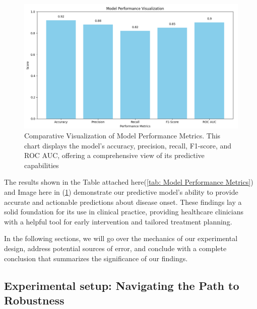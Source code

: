\documentclass[manuscript,screen,]{acmart}
\begin{document}
\begin{figure}
    \centering
    \includegraphics[width=0.5\linewidth]{Images//Sections/Model Performance Visualization.png}
    \caption{Comparative Visualization of Model Performance Metrics. This chart displays the model's accuracy, precision, recall, F1-score, and ROC AUC, offering a comprehensive view of its predictive capabilities}
    \label{fig: Model Performance Visualization}
\end{figure}

The results shown in the Table attached here(\ref{tab: Model Performance Metrics}) and Image here in (\ref{fig: Model Performance Visualization}) demonstrate our predictive model's ability to provide accurate and actionable predictions about disease onset. These findings lay a solid foundation for its use in clinical practice, providing healthcare clinicians with a helpful tool for early intervention and tailored treatment planning.

In the following sections, we will go over the mechanics of our experimental design, address potential sources of error, and conclude with a complete conclusion that summarizes the significance of our findings.

\subsection{Experimental setup: Navigating the Path to Robustness}
\end{document}
